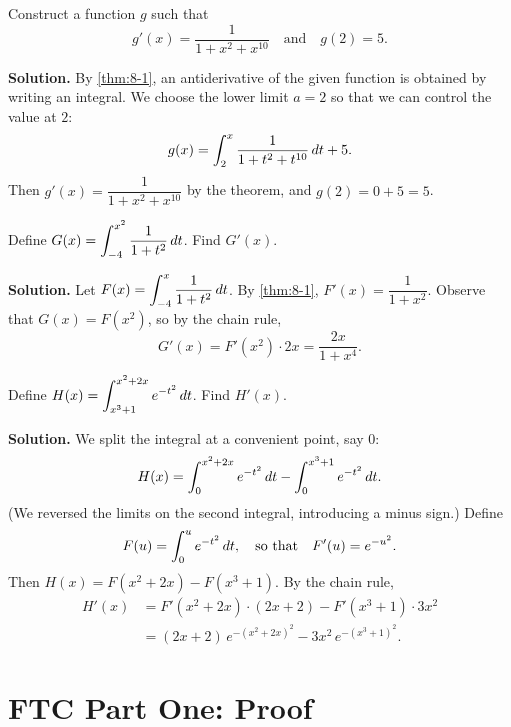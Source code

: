 \begin{example}
\label{ex:8-5}
Construct a function $g$ such that
\[
  g'(x) = \frac{1}{1 + x^{2} + x^{10}} \quad \text{and} \quad g(2) = 5.
\]

\textbf{Solution.}  By \cref{thm:8-1}, an antiderivative of the given function is obtained by writing an integral.  We choose the lower limit $a = 2$ so that we can control the value at $2$:
\[
  g(x) = \int_{2}^{x} \frac{1}{1 + t^{2} + t^{10}}\,dt + 5.
\]
Then $g'(x) = \dfrac{1}{1 + x^{2} + x^{10}}$ by the theorem, and $g(2) = 0 + 5 = 5$.
\end{example}

\begin{example}
\label{ex:8-6}
Define $G(x) = \displaystyle\int_{-4}^{x^{2}} \frac{1}{1+t^{2}}\,dt$.  Find $G'(x)$.

\textbf{Solution.}  Let $F(x) = \displaystyle\int_{-4}^{x} \frac{1}{1+t^{2}}\,dt$.  By \cref{thm:8-1}, $F'(x) = \dfrac{1}{1+x^{2}}$.  Observe that $G(x) = F(x^{2})$, so by the chain rule,
\[
  G'(x) = F'(x^{2})\cdot 2x = \frac{2x}{1 + x^{4}}.
\]
\end{example}

\begin{example}
\label{ex:8-7}
Define $H(x) = \displaystyle\int_{x^{3}+1}^{x^{2}+2x} e^{-t^{2}}\,dt$.  Find $H'(x)$.

\textbf{Solution.}  We split the integral at a convenient point, say $0$:
\[
  H(x) = \int_{0}^{x^{2}+2x} e^{-t^{2}}\,dt - \int_{0}^{x^{3}+1} e^{-t^{2}}\,dt.
\]
(We reversed the limits on the second integral, introducing a minus sign.)  Define
\[
  F(u) = \int_{0}^{u} e^{-t^{2}}\,dt, \quad \text{so that} \quad F'(u) = e^{-u^{2}}.
\]
Then $H(x) = F\!\left(x^{2}+2x\right) - F\!\left(x^{3}+1\right)$.  By the chain rule,
\begin{align*}
  H'(x) &= F'\!\left(x^{2}+2x\right)\cdot(2x+2) - F'\!\left(x^{3}+1\right)\cdot 3x^{2} \\
         &= (2x+2)\,e^{-(x^{2}+2x)^{2}} - 3x^{2}\,e^{-(x^{3}+1)^{2}}.
\end{align*}
\end{example}

\section{FTC Part One: Proof}
\label{sec:8.4}

